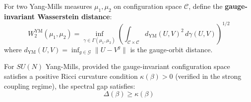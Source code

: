 \begin{definition}
For two Yang-Mills measures $\mu_1, \mu_2$ on configuration space $\mathcal{C}$, 
define the \textbf{gauge-invariant Wasserstein distance}:
\[
W_2^{\text{YM}}(\mu_1, \mu_2) = \inf_{\gamma \in \Gamma(\mu_1, \mu_2)} 
\left(\int_{\mathcal{C} \times \mathcal{C}} d_{\text{YM}}(U, V)^2 \, d\gamma(U, V)\right)^{1/2}
\]
where $d_{\text{YM}}(U, V) = \inf_{g \in \mathcal{G}} \|U - V^g\|$ is the 
gauge-orbit distance.
\end{definition}

\begin{theorem}
\label{thm:GT-OT}
For $SU(N)$ Yang-Mills, provided the gauge-invariant configuration space satisfies a positive Ricci curvature condition $\kappa(\beta) > 0$ (verified in the strong coupling regime), the spectral gap satisfies:
\[
\Delta(\beta) \geq \kappa(\beta)
\]
\end{theorem}

